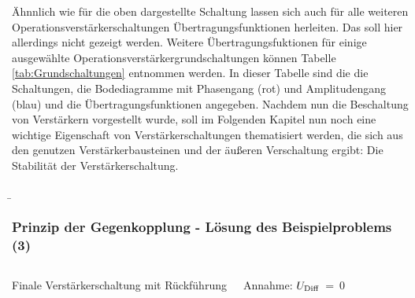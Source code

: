 \begin{frame}
{        \par
        Ähnnlich wie für die oben dargestellte Schaltung lassen sich auch für alle weiteren Operationsverstärkerschaltungen Übertragungsfunktionen herleiten. Das soll hier allerdings nicht gezeigt werden.
        Weitere Übertragungsfuktionen für einige ausgewählte Operationsverstärkergrundschaltungen können Tabelle \ref{tab:Grundschaltungen} entnommen werden.
        In dieser Tabelle sind die die Schaltungen, die Bodediagramme mit Phasengang (rot) und Amplitudengang (blau) und die Übertragungsfunktionen angegeben.
        Nachdem nun die Beschaltung von Verstärkern vorgestellt wurde, soll im Folgenden Kapitel nun noch eine wichtige Eigenschaft von Verstärkerschaltungen thematisiert werden, die sich aus den genutzen Verstärkerbausteinen und der äußeren Verschaltung ergibt: Die Stabilität der Verstärkerschaltung.
    
        \begin{block}{}
            
        \end{block}
    }

    \b{
        \frametitle{Prinzip der Gegenkopplung - Lösung des Beispielproblems (3)}
        \begin{columns}
            \begin{center}
                \scalebox{0.8}{}
                Finale Verstärkerschaltung mit Rückführung
                \label{fig:Verschaltung des Verstärkers2}
            \end{center}
            Annahme: $U_{\textnormal{Diff}}$~=~0
        \end{columns}
    }
 \end{frame}

